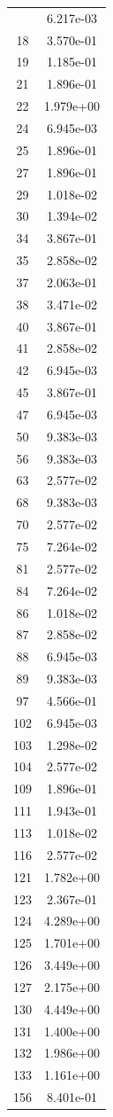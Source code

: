\documentclass[12pt]{article}
\begin{document}
\begin{longtable}{@{}cc@{}}
\bottomrule
\endlastfoot
13 & 6.217e-03 \\
18 & 3.570e-01 \\
19 & 1.185e-01 \\
21 & 1.896e-01 \\
22 & 1.979e+00 \\
24 & 6.945e-03 \\
25 & 1.896e-01 \\
27 & 1.896e-01 \\
29 & 1.018e-02 \\
30 & 1.394e-02 \\
34 & 3.867e-01 \\
35 & 2.858e-02 \\
37 & 2.063e-01 \\
38 & 3.471e-02 \\
40 & 3.867e-01 \\
41 & 2.858e-02 \\
42 & 6.945e-03 \\
45 & 3.867e-01 \\
47 & 6.945e-03 \\
50 & 9.383e-03 \\
56 & 9.383e-03 \\
63 & 2.577e-02 \\
68 & 9.383e-03 \\
70 & 2.577e-02 \\
75 & 7.264e-02 \\
81 & 2.577e-02 \\
84 & 7.264e-02 \\
86 & 1.018e-02 \\
87 & 2.858e-02 \\
88 & 6.945e-03 \\
89 & 9.383e-03 \\
97 & 4.566e-01 \\
102 & 6.945e-03 \\
103 & 1.298e-02 \\
104 & 2.577e-02 \\
109 & 1.896e-01 \\
111 & 1.943e-01 \\
113 & 1.018e-02 \\
116 & 2.577e-02 \\
121 & 1.782e+00 \\
123 & 2.367e-01 \\
124 & 4.289e+00 \\
125 & 1.701e+00 \\
126 & 3.449e+00 \\
127 & 2.175e+00 \\
130 & 4.449e+00 \\
131 & 1.400e+00 \\
132 & 1.986e+00 \\
133 & 1.161e+00 \\
156 & 8.401e-01 \\

\bottomrule
\end{longtable}
\end{document}

